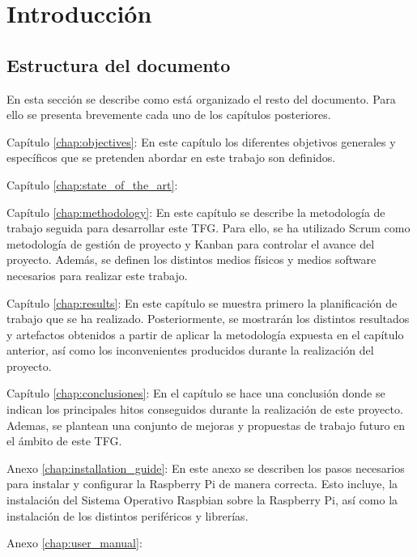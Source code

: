 \chapter{Introducción} %


\section{Estructura del documento}
En esta sección se describe como está organizado el resto del documento. Para ello se presenta brevemente cada uno de los capítulos posteriores.

\begin{definitionlist}
	\item[Capítulo \ref{chap:objectives}: \nameref{chap:objectives}] En este capítulo los diferentes objetivos generales y específicos que se pretenden abordar en este trabajo son definidos.
	
	\item[Capítulo \ref{chap:state_of_the_art}: \nameref{chap:state_of_the_art}] 
	
	\item[Capítulo \ref{chap:methodology}: \nameref{chap:methodology}] En este capítulo se describe la metodología de trabajo seguida para desarrollar este \ac{TFG}. Para ello, se ha utilizado Scrum como metodología de gestión de proyecto y Kanban para controlar el avance del proyecto. Además, se definen los distintos medios físicos y medios software necesarios para realizar este trabajo.
	
	\item[Capítulo \ref{chap:results}: \nameref{chap:results}] En este capítulo se muestra primero la planificación de trabajo que se ha realizado. Posteriormente, se mostrarán los distintos resultados y artefactos obtenidos a partir de aplicar la metodología expuesta en el capítulo anterior, así como los inconvenientes producidos durante la realización del proyecto.
	
	\item[Capítulo \ref{chap:conclusiones}: \nameref{chap:conclusiones}] En el capítulo se hace una conclusión donde se indican los principales hitos conseguidos durante la realización de este proyecto. Ademas, se plantean una conjunto de mejoras y propuestas de trabajo futuro en el ámbito de este \ac{TFG}. 
	
	\item[Anexo \ref{chap:installation_guide}: \nameref{chap:installation_guide}] En este anexo se describen los pasos necesarios para instalar y configurar la Raspberry Pi de manera correcta. Esto incluye, la instalación del Sistema Operativo Raspbian sobre la Raspberry Pi, así como la instalación de los distintos periféricos y librerías.
	
	\item[Anexo \ref{chap:user_manual}: \nameref{chap:user_manual}] 
	
\end{definitionlist}
